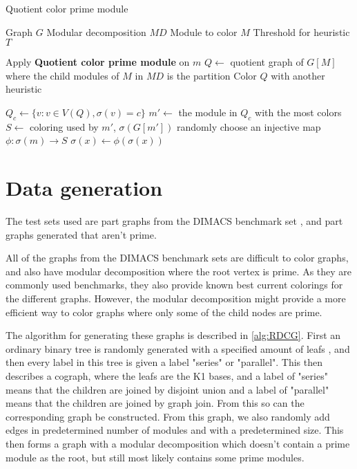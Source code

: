 \documentclass[a4paper]{article}
\begin{document}
\begin{algorithm}[H]
  \caption{Quotient color prime module}
  \begin{algorithmic}[1]
    \REQUIRE Graph $G$
    \REQUIRE Modular decomposition $MD$
    \REQUIRE Module to color $M$
    \REQUIRE Threshold for heuristic $T$

    \ENDIF
        \STATE Apply \textbf{Quotient color prime module} on $m$
    \ENDFOR
    \STATE $Q \leftarrow $ quotient graph of $G[M]$ where the child modules of $M$ in $MD$ is the partition
    \STATE Color $Q$ with another heuristic

        \STATE $Q_c \leftarrow \{ v : v \in V(Q), \sigma(v) = c\}$
        \STATE $m' \leftarrow$ the module in $Q_c$ with the most colors
        \STATE $S \leftarrow$ coloring used by $m'$, $\sigma(G[m'])$
            \STATE randomly choose an injective map $\phi:\sigma(m)\to S$
                \STATE $\sigma(x) \leftarrow \phi(\sigma(x))$
            \ENDFOR
        \ENDFOR
    \ENDFOR

  \end{algorithmic}
\end{algorithm}

\section{Data generation}
\label{sec:Data}

The test sets used are part graphs from the DIMACS benchmark set \cite{DIMACS}, 
and part graphs generated that aren't prime.

All of the graphs from the DIMACS benchmark sets are difficult to color graphs,
and also have modular decomposition where the root vertex is prime. As they are
commonly used benchmarks, they also provide known best current colorings for the
different graphs. However, the modular decomposition might provide a more
efficient way to color graphs where only some of the child nodes are prime. 

The algorithm for generating these graphs is described in \autoref{alg:RDCG}.
First an ordinary binary tree is randomly generated with a specified amount of
leafs , and then every label in this tree is given a label "series" or
"parallel".  This then describes a cograph, where the leafs are the K1 bases,
and a label of "series" means that the children are joined by disjoint union and
a label of "parallel" means that the children are joined by graph join.  From
this so can the corresponding graph be constructed. From this graph, we also
randomly add edges in predetermined number of modules and with a predetermined
size. This then forms a graph with a modular decomposition which doesn't contain
a prime module as the root, but still most likely contains some prime modules.
\end{document}
